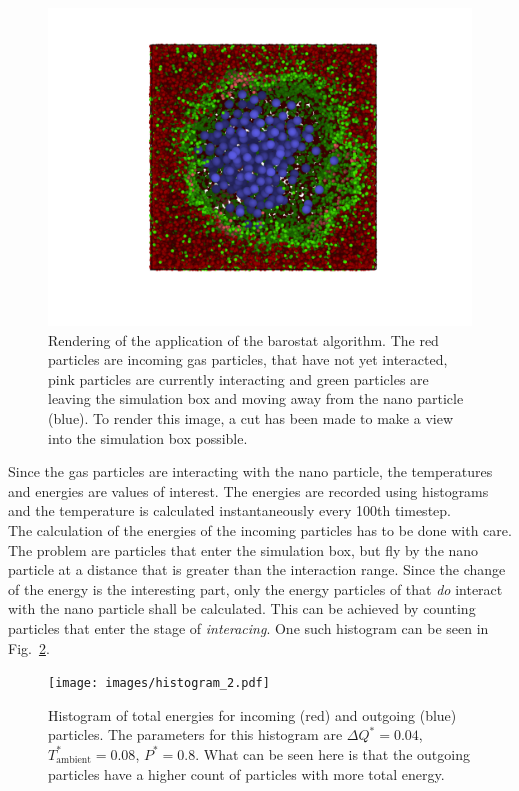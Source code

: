 \documentclass[12pt]{article}
\begin{document}
\begin{figure}[h]
    \begin{center}
        \includegraphics[scale=0.4]{images/baro_170105_new_medium.png}
        \caption{Rendering of the application of the barostat algorithm. The red particles are incoming gas particles, that have not yet interacted, 
            pink particles are currently interacting and green particles are leaving the simulation box and
        moving away from the nano particle (blue). To render this image, a cut has been made to make a view into the simulation box possible.}
        \label{fig:barointeraction}
    \end{center}
\end{figure}
Since the gas particles are interacting with the nano particle, the temperatures and energies are values of interest. The energies are recorded using
histograms and the temperature is calculated instantaneously every 100th timestep.\\
The calculation of the energies of the incoming particles has to be done with care. The problem are particles that enter the simulation box, but fly
by the nano particle at a distance that is greater than the interaction range. Since the change of the energy is the interesting part, only the energy 
particles of that \textit{do} interact with the nano particle shall be calculated. This can be achieved by counting particles that enter the stage of
\textit{interacing}. One such histogram can be seen in Fig.~\ref{fig:histogram}.
\begin{figure}[h]
    \begin{center}
        \texttt{[image: images/histogram\_2.pdf]}
        \caption{Histogram of total energies for incoming (red) and outgoing (blue) particles. The parameters for this histogram are $\Delta Q^*=0.04$,
        $T_\text{ambient}^*=0.08$, $P^*=0.8$. What can be seen here is that the outgoing particles have a higher count of particles with more total
    energy.}
        \label{fig:histogram}
    \end{center}
\end{figure}
\end{document}
